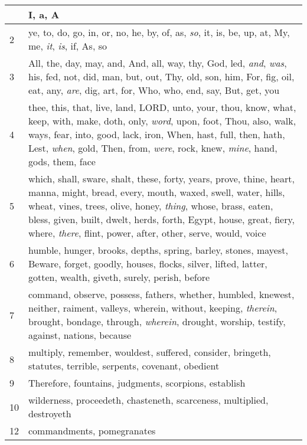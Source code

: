 \begin{longtable}{l|p{3.75in}}
\hline \hline
\endlastfoot
1 & I, a, A \\ \hline
2 & ye, to, do, go, in, or, no, he, by, of, as, \emph{so}, it, is, be, up, at, My, me, \emph{it}, \emph{is}, if, As, so \\ \hline
3 & All, the, day, may, and, And, all, way, thy, God, led, \emph{and}, \emph{was}, his, fed, not, did, man, but, out, Thy, old, son, him, For, fig, oil, eat, any, \emph{are}, dig, art, for, Who, who, end, say, But, get, you \\ \hline
4 & thee, this, that, live, land, LORD, unto, your, thou, know, what, keep, with, make, doth, only, \emph{word}, upon, foot, Thou, also, walk, ways, fear, into, good, lack, iron, When, hast, full, then, hath, Lest, \emph{when}, gold, Then, from, \emph{were}, rock, knew, \emph{mine}, hand, gods, them, face \\ \hline
5 & which, shall, sware, shalt, these, forty, years, prove, thine, heart, manna, might, bread, every, mouth, waxed, swell, water, hills, wheat, vines, trees, olive, honey, \emph{thing}, whose, brass, eaten, bless, given, built, dwelt, herds, forth, Egypt, house, great, fiery, where, \emph{there}, flint, power, after, other, serve, would, voice \\ \hline
6 & humble, hunger, brooks, depths, spring, barley, stones, mayest, Beware, forget, goodly, houses, flocks, silver, lifted, latter, gotten, wealth, giveth, surely, perish, before \\ \hline
7 & command, observe, possess, fathers, whether, humbled, knewest, neither, raiment, valleys, wherein, without, keeping, \emph{therein}, brought, bondage, through, \emph{wherein}, drought, worship, testify, against, nations, because \\ \hline
8 & multiply, remember, wouldest, suffered, consider, bringeth, statutes, terrible, serpents, covenant, obedient \\ \hline
9 & Therefore, fountains, judgments, scorpions, establish \\ \hline
10 & wilderness, proceedeth, chasteneth, scarceness, multiplied, destroyeth \\ \hline
12 & commandments, pomegranates \\ \hline
\end{longtable}






